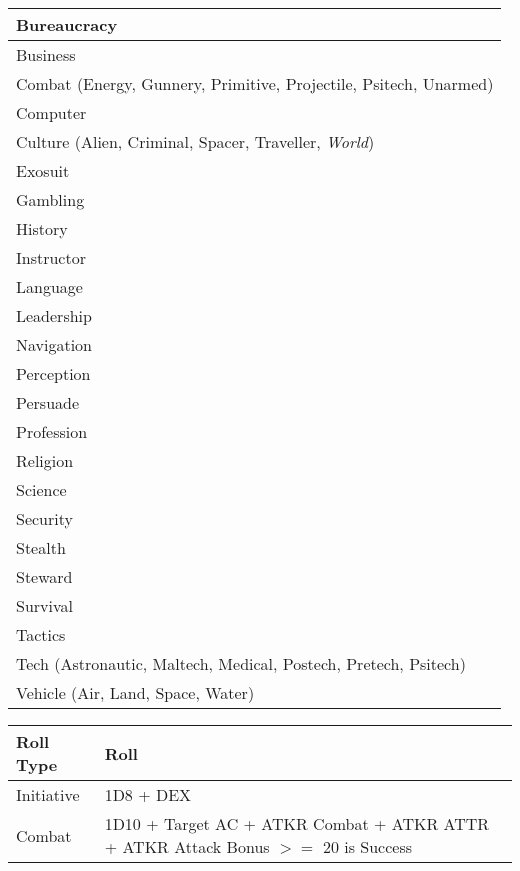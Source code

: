 \documentclass[10pt,letterpaper]{article}
\begin{document}
\begin{multicols}{3}
\begin{tabularx}{\columnwidth}{ | X |}
        \hline
        Bureaucracy \\
        \hline
        Business \\
        \hline
        Combat (Energy, Gunnery, Primitive, Projectile, Psitech, Unarmed) \\
        \hline
        Computer \\
        \hline
        Culture (Alien, Criminal, Spacer, Traveller, \textit{World}) \\
        \hline
        Exosuit \\
        \hline
        Gambling \\
        \hline
        History \\
        \hline
        Instructor \\
        \hline
        Language \\
        \hline
        Leadership \\
        \hline
        Navigation \\
        \hline
        Perception \\
        \hline
        Persuade \\
        \hline
        Profession \\
        \hline
        Religion \\
        \hline
        Science \\
        \hline
        Security \\
        \hline
        Stealth \\
        \hline
        Steward \\
        \hline
        Survival \\ 
        \hline
        Tactics \\
        \hline
        Tech (Astronautic, Maltech, Medical, Postech, Pretech, Psitech) \\
        \hline
        Vehicle (Air, Land, Space, Water) \\
        \hline
    \end{tabularx}
    \begin{tabularx}{\columnwidth}{ | l | X | }
        \hline
        \textbf{Roll Type} & \textbf{Roll} \\
        \hline
        Initiative & 1D8 + DEX \\
        \hline
        Combat & 1D10 + Target AC + ATKR Combat + ATKR ATTR + ATKR Attack Bonus $>=$ 20 is Success \\
        \hline
    \end{tabularx}
    \begin{tabularx}{\columnwidth}{ | l | X | }

\end{tabularx}
\end{multicols}
\end{document}
